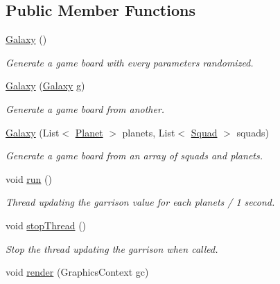 \subsection*{Public Member Functions}
\begin{DoxyCompactItemize}
\item 
\hyperlink{classfr_1_1projet_1_1groupe40_1_1model_1_1board_1_1_galaxy_a9fc182ce74a25f23495edadbac56e787}{Galaxy} ()
\begin{DoxyCompactList}\small\item\em Generate a game board with every parameters randomized. \end{DoxyCompactList}\item 
\hyperlink{classfr_1_1projet_1_1groupe40_1_1model_1_1board_1_1_galaxy_adf41b1524b98b0fc609d3f8950aa2c62}{Galaxy} (\hyperlink{classfr_1_1projet_1_1groupe40_1_1model_1_1board_1_1_galaxy}{Galaxy} g)
\begin{DoxyCompactList}\small\item\em Generate a game board from another. \end{DoxyCompactList}\item 
\hyperlink{classfr_1_1projet_1_1groupe40_1_1model_1_1board_1_1_galaxy_af97d7f23693a211e91502348f0f06add}{Galaxy} (List$<$ \hyperlink{classfr_1_1projet_1_1groupe40_1_1model_1_1board_1_1_planet}{Planet} $>$ planets, List$<$ \hyperlink{classfr_1_1projet_1_1groupe40_1_1model_1_1ships_1_1_squad}{Squad} $>$ squads)
\begin{DoxyCompactList}\small\item\em Generate a game board from an array of squads and planets. \end{DoxyCompactList}\item 
void \hyperlink{classfr_1_1projet_1_1groupe40_1_1model_1_1board_1_1_galaxy_ae111f4acddd20f276118c6190fe377e7}{run} ()
\begin{DoxyCompactList}\small\item\em Thread updating the garrison value for each planets / 1 second. \end{DoxyCompactList}\item 
void \hyperlink{classfr_1_1projet_1_1groupe40_1_1model_1_1board_1_1_galaxy_a9758b40b129bd15cea53011c4c632034}{stop\+Thread} ()
\begin{DoxyCompactList}\small\item\em Stop the thread updating the garrison when called. \end{DoxyCompactList}\item 
void \hyperlink{classfr_1_1projet_1_1groupe40_1_1model_1_1board_1_1_galaxy_a4d87d109c4c08d5b6047b7fe6c35a2e6}{render} (Graphics\+Context gc)

\end{DoxyCompactItemize}
